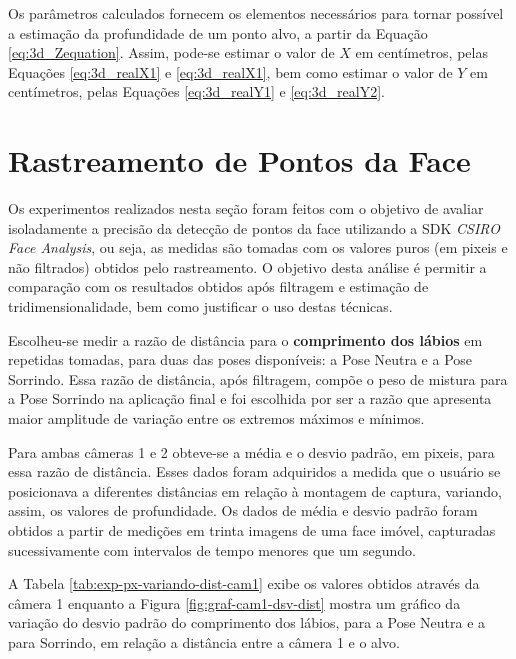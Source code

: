 Os parâmetros calculados fornecem os elementos necessários para tornar possível a estimação da profundidade de um ponto alvo, a partir da Equação \ref{eq:3d_Zequation}. Assim, pode-se estimar o valor de $X$ em centímetros, pelas Equações \ref{eq:3d_realX1} e \ref{eq:3d_realX1}, bem como estimar o valor de $Y$ em centímetros, pelas Equações \ref{eq:3d_realY1} e \ref{eq:3d_realY2}.

\section{Rastreamento de Pontos da Face}

Os experimentos realizados nesta seção foram feitos com o objetivo de avaliar isoladamente a precisão da detecção de pontos da face utilizando a SDK \textit{CSIRO Face Analysis}, ou seja, as medidas são tomadas com os valores puros (em pixeis e não filtrados) obtidos pelo rastreamento. O objetivo desta análise é permitir a comparação com os resultados obtidos após filtragem e estimação de tridimensionalidade, bem como justificar o uso destas técnicas.


Escolheu-se medir a razão de distância para o \textbf{comprimento dos lábios} em repetidas tomadas, para duas das poses disponíveis: a Pose Neutra e a Pose Sorrindo. Essa razão de distância, após filtragem, compõe o peso de mistura para a Pose Sorrindo na aplicação final e foi escolhida por ser a razão que apresenta maior amplitude de variação entre os extremos máximos e mínimos.

Para ambas câmeras 1 e 2 obteve-se a média e o desvio padrão, em pixeis, para essa razão de distância. Esses dados foram adquiridos a medida que o usuário se posicionava a diferentes distâncias em relação à montagem de captura, variando, assim, os valores de profundidade. Os dados de média e desvio padrão foram obtidos a partir de medições em trinta imagens de uma face imóvel, capturadas sucessivamente com intervalos de tempo menores que um segundo.

A Tabela \ref{tab:exp-px-variando-dist-cam1} exibe os valores obtidos através da câmera 1 enquanto a Figura \ref{fig:graf-cam1-dsv-dist} mostra um gráfico da variação do desvio padrão do comprimento dos lábios, para a Pose Neutra e a para Sorrindo, em relação a distância entre a câmera 1 e o alvo.


